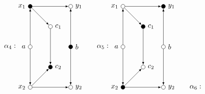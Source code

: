 \[
  \begin{tikzpicture}
    [
    point/.style={circle,draw,inner sep=0pt,minimum size=2mm},
    one/.style={fill=black},
    collection/.style={thick,rectangle,draw,inner sep=0pt,minimum height=14mm, minimum width= 9mm}
    ]
    \node (label) at (-1,2) {$\alpha_4:$};
    \node (a) at (0,2) [point,label=left:$a$] {};
    \node (x1) at (0,4) [point, one,label=left:$x_1$] {};
    \node (x2) at (0,0) [point,label=left:$x_2$] {};
    \node (b) at (2,2) [point, one,label=right:$b$] {};
    \node (y1) at (2,4) [point,label=right:$y_1$] {};
    \node (y2) at (2,0) [point,label=right:$y_2$] {};
    \node (c1) at (1,3) [point,label=right:$c_1$] {};
    \node (c2) at (1,1) [point, one,label=right:$c_2$] {};
    \draw [-latex] (a) to (x1);
    \draw [-latex] (a) to (x2);
    \draw [-latex] (b) to (y1);
    \draw [-latex] (b) to (y2);
    \draw [-latex] (x1) to (y1);
    \draw [-latex] (x1) to (c1);
    \draw [-latex] (x2) to (y2);
    \draw [-latex] (x2) to (c2);
    \draw [-latex] (c1) to (c2);
  \end{tikzpicture}
  \hspace{5mm}
  \begin{tikzpicture}
    [
    point/.style={circle,draw,inner sep=0pt,minimum size=2mm},
    one/.style={fill=black},
    collection/.style={thick,rectangle,draw,inner sep=0pt,minimum height=14mm, minimum width= 9mm}
    ]
    \node (label) at (-1,2) {$\alpha_5:$};
    \node (a) at (0,2) [point,label=left:$a$] {};
    \node (x1) at (0,4) [point,label=left:$x_1$] {};
    \node (x2) at (0,0) [point, one,label=left:$x_2$] {};
    \node (b) at (2,2) [point,label=right:$b$] {};
    \node (y1) at (2,4) [point, one, label=right:$y_1$] {};
    \node (y2) at (2,0) [point,label=right:$y_2$] {};
    \node (c1) at (1,3) [point, one,label=right:$c_1$] {};
    \node (c2) at (1,1) [point,label=right:$c_2$] {};
    \draw [-latex] (a) to (x1);
    \draw [-latex] (a) to (x2);
    \draw [-latex] (b) to (y1);
    \draw [-latex] (b) to (y2);
    \draw [-latex] (x1) to (y1);
    \draw [-latex] (x1) to (c1);
    \draw [-latex] (x2) to (y2);
    \draw [-latex] (x2) to (c2);
    \draw [-latex] (c1) to (c2);
  \end{tikzpicture}
  \hspace{5mm}
  \begin{tikzpicture}
    [
    point/.style={circle,draw,inner sep=0pt,minimum size=2mm},
    one/.style={fill=black},
    collection/.style={thick,rectangle,draw,inner sep=0pt,minimum height=14mm, minimum width= 9mm}
    ]
    \node (label) at (-1,2) {$\alpha_6:$};

\end{tikzpicture}\]
